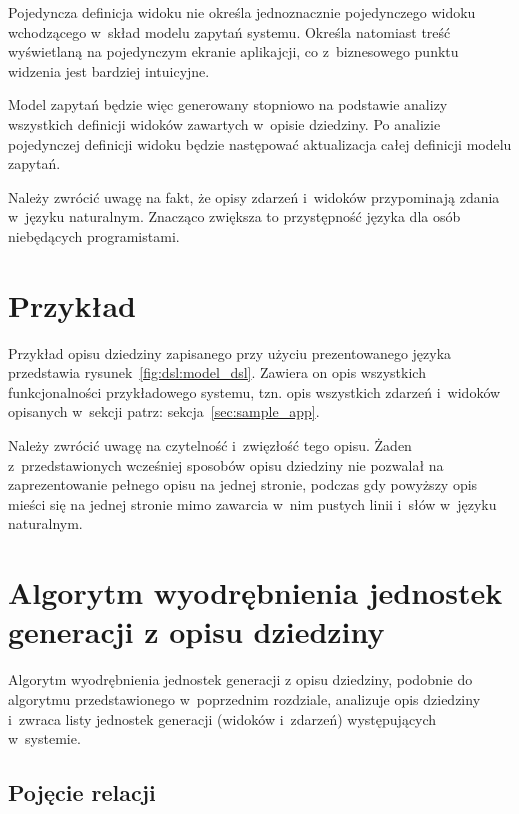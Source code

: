 Pojedyncza definicja widoku nie określa jednoznacznie pojedynczego widoku wchodzącego w~skład modelu zapytań systemu.
Określa natomiast treść wyświetlaną na pojedynczym ekranie aplikajcji, co z~biznesowego punktu widzenia jest bardziej intuicyjne.

Model zapytań będzie więc generowany stopniowo na podstawie analizy wszystkich definicji widoków zawartych w~opisie dziedziny.
Po analizie pojedynczej definicji widoku będzie następować aktualizacja całej definicji modelu zapytań.

Należy zwrócić uwagę na fakt, że opisy zdarzeń i~widoków przypominają zdania w~języku naturalnym.
Znacząco zwiększa to przystępność języka dla osób niebędących programistami.


\section{Przykład}

Przykład opisu dziedziny zapisanego przy użyciu prezentowanego języka przedstawia rysunek~\ref{fig:dsl:model_dsl}.
Zawiera on opis wszystkich funkcjonalności przykładowego systemu, tzn. opis wszystkich zdarzeń i~widoków opisanych w~sekcji patrz: sekcja~\ref{sec:sample_app}.



Należy zwrócić uwagę na czytelność i~zwięzłość tego opisu.
Żaden z~przedstawionych wcześniej sposobów opisu dziedziny nie pozwalał na zaprezentowanie pełnego opisu na jednej stronie, podczas gdy powyższy opis mieści się na jednej stronie mimo zawarcia w~nim pustych linii i~słów w~języku naturalnym.



\section{Algorytm wyodrębnienia jednostek generacji z opisu dziedziny} \label{sec:dsl:gen_unit_extraction}

Algorytm wyodrębnienia jednostek generacji z opisu dziedziny, podobnie do algorytmu przedstawionego w~poprzednim rozdziale, analizuje opis dziedziny i~zwraca listy jednostek generacji (widoków i~zdarzeń) występujących w~systemie.


\subsection{Pojęcie relacji}

